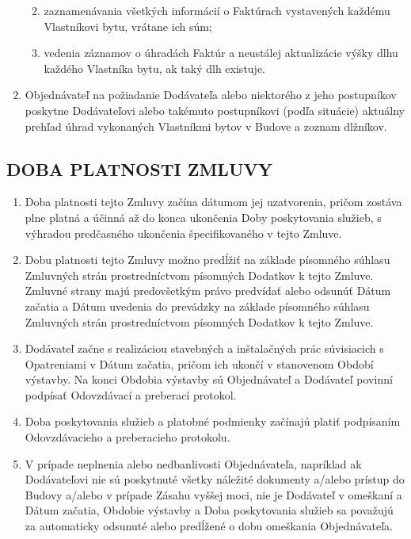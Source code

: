 \begin{multicols}{2}
\begin{enumerate}
  \begin{enumerate}
  \def\labelenumii{\arabic{enumii}.}
  \item
    zaznamenávania všetkých informácií o Faktúrach vystavených každému
    Vlastníkovi bytu, vrátane ich súm;
  \item
    vedenia záznamov o úhradách Faktúr a neustálej aktualizácie výšky
    dlhu každého Vlastníka bytu, ak taký dlh existuje.
  \end{enumerate}
\item
  Objednávateľ na požiadanie Dodávateľa alebo niektorého z jeho
  postupníkov poskytne Dodávateľovi alebo takémuto postupníkovi (podľa
  situácie) aktuálny prehľad úhrad vykonaných Vlastníkmi bytov v Budove
  a zoznam dlžníkov.
\end{enumerate}

\subsection{DOBA PLATNOSTI ZMLUVY}

\begin{enumerate}
\def\labelenumi{\arabic{enumi}.}
\item
  Doba platnosti tejto Zmluvy začína dátumom jej uzatvorenia, pričom
  zostáva plne platná a účinná až do konca ukončenia Doby poskytovania
  služieb, s výhradou predčasného ukončenia špecifikovaného v tejto
  Zmluve.
\item
  Dobu platnosti tejto Zmluvy možno predĺžiť na základe písomného
  súhlasu Zmluvných strán prostredníctvom písomných Dodatkov k tejto
  Zmluve. Zmluvné strany majú predovšetkým právo predvídať alebo odsunúť
  Dátum začatia a Dátum uvedenia do prevádzky na základe písomného
  súhlasu Zmluvných strán prostredníctvom písomných Dodatkov k tejto
  Zmluve.
\item
  Dodávateľ začne s realizáciou stavebných a inštalačných prác
  súvisiacich s Opatreniami v Dátum začatia, pričom ich ukončí v
  stanovenom Období výstavby. Na konci Obdobia výstavby sú Objednávateľ
  a Dodávateľ povinní podpísať Odovzdávací a preberací protokol.
\item
  Doba poskytovania služieb a platobné podmienky začínajú platiť
  podpísaním Odovzdávacieho a preberacieho protokolu.
\item
  V prípade neplnenia alebo nedbanlivosti Objednávateľa, napríklad ak
  Dodávateľovi nie sú poskytnuté všetky náležité dokumenty a/alebo
  prístup do Budovy a/alebo v prípade Zásahu vyššej moci, nie je
  Dodávateľ v omeškaní a Dátum začatia, Obdobie výstavby a Doba
  poskytovania služieb sa považujú za automaticky odsunuté alebo
  predĺžené o dobu omeškania Objednávateľa.
\end{enumerate}


\end{multicols}
